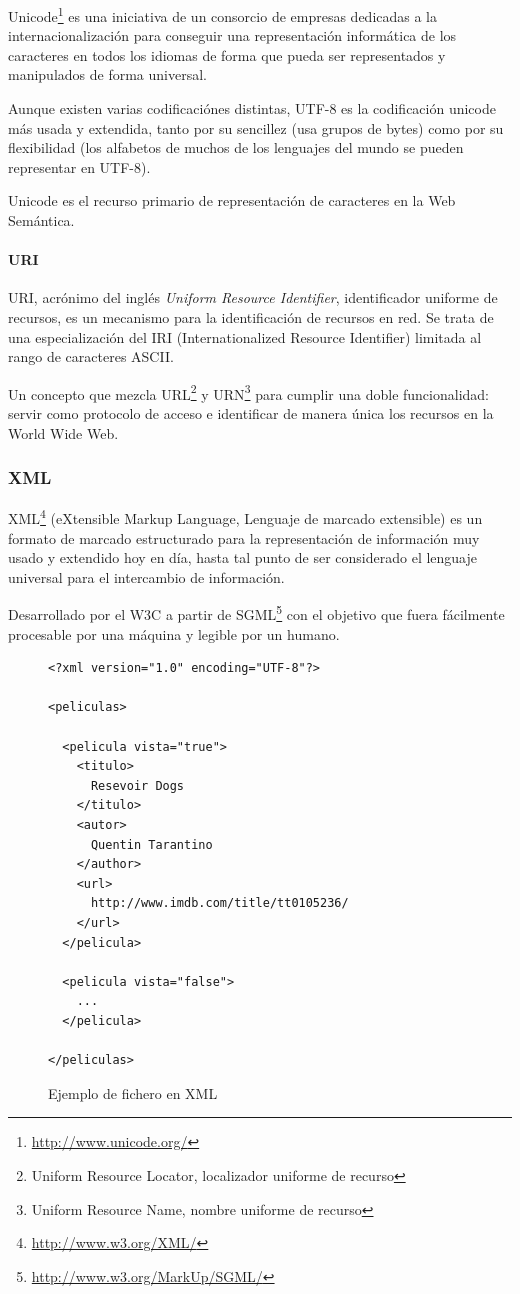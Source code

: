 Unicode\footnote{\url{http://www.unicode.org/}} es una iniciativa de un consorcio de 
empresas dedicadas a la internacionalización para conseguir una representación 
informática de los caracteres en todos los idiomas de forma que pueda ser representados
y manipulados de forma universal. 

Aunque existen varias codificaciónes distintas, UTF-8\cite{Yergeau2003} es la 
codificación unicode más usada y extendida, tanto por su sencillez (usa grupos 
de bytes) como por su flexibilidad (los alfabetos de muchos de los lenguajes 
del mundo se pueden representar en UTF-8).

Unicode es el recurso primario de representación de caracteres en la Web Semántica.

\paragraph{URI}

URI\cite{Berners-Lee1998}, acrónimo del inglés \emph{Uniform Resource Identifier}, 
identificador uniforme de recursos, es un mecanismo para la identificación de recursos
en red. Se trata de una especialización del IRI (Internationalized Resource Identifier) 
limitada al rango de caracteres ASCII.

Un concepto que mezcla URL\footnote{Uniform Resource Locator, localizador uniforme de recurso} 
y URN\footnote{Uniform Resource Name, nombre uniforme de recurso} para cumplir una doble 
funcionalidad: servir como protocolo de acceso e identificar de manera única los recursos 
en la World Wide Web.

\subsubsection{XML}

XML\footnote{\url{http://www.w3.org/XML/}} (eXtensible Markup Language, Lenguaje 
de marcado extensible) es un formato de marcado estructurado para la representación 
de información muy usado y extendido hoy en día, hasta tal punto de ser considerado 
el lenguaje universal para el intercambio de información. 

Desarrollado por el W3C a partir de SGML\footnote{\url{http://www.w3.org/MarkUp/SGML/}} 
con el objetivo que fuera fácilmente procesable por una máquina y legible por un 
humano. 

\begin{figure}[H]
\lstset{language=XML}
\begin{lstlisting}
<?xml version="1.0" encoding="UTF-8"?>

<peliculas>

  <pelicula vista="true">
    <titulo>
      Resevoir Dogs
    </titulo>
    <autor>
      Quentin Tarantino
    </author>
    <url>
      http://www.imdb.com/title/tt0105236/
    </url>
  </pelicula>

  <pelicula vista="false">
    ...
  </pelicula>

</peliculas>
\end{lstlisting}
\caption{Ejemplo de fichero en XML}
\label{fig:ejemplo.xml}
\end{figure}

